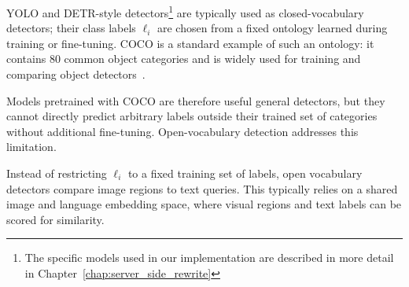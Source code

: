 


YOLO and DETR-style detectors\footnote{The specific models used in our implementation are described in more detail in Chapter~\ref{chap:server_side_rewrite}} are typically used as closed-vocabulary detectors; their class labels \(\ell_i\) are chosen from a fixed ontology learned during training or fine-tuning. COCO is a standard example of such an ontology: it contains 80 common object categories and is widely used for training and comparing object detectors~\cite{lin2015microsoftcococommonobjects}.

Models pretrained with COCO are therefore useful general detectors, but they cannot directly predict arbitrary labels outside their trained set of categories without additional fine-tuning. Open-vocabulary detection addresses this limitation.

Instead of restricting \(\ell_i\) to a fixed training set of labels, open vocabulary detectors compare image regions to text queries. This typically relies on a shared image and language embedding space, where visual regions and text labels can be scored for similarity.

